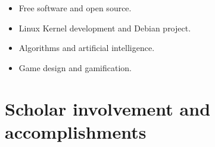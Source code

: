 \documentclass{res}
\newcommand{\inFrench}[1]{}
\newcommand{\inEnglish}[1]{#1}
\begin{document}
\begin{resume}
\inEnglish{
	\vspace{6pt}
	\begin{itemize} \itemsep -2pt
		\item Free software and open source.
		\item Linux Kernel development and Debian project.
		\item Algorithms and artificial intelligence.
		\item Game design and gamification.
	\end{itemize}
}

\inFrench{
	\section{Implication scolaire et accomplissements}
}
\inEnglish{
	\section{Scholar involvement and accomplishments}
}
\vspace{6pt}

\inFrench{
	SORT: Sustainability through Object Recognition and Training
	\hfill January to April 2017 \\
	{\sl Technical leader} \hfill (Projet de fin d'études universitaires)
	\vspace{0.05in}
	\begin{itemize} \itemsep -2pt
		\item Création d'une application reconnaissant les déchets dans une image pour aider la communauté.
		\item Recherche de logiciel de reconnaissance d'images (OpenCV, Yolo).
		\item Déploiment d'une architecture à multiple application avec Docker et Docker-compose.
		\item Gestion d'un projet open source sur GitHub (release, pull request, board, etc.).
	\end{itemize}

	{\sl Membre du club Formule ÉTS} \hfill (Club étudiant)
	\vspace{0.05in}
	\begin{itemize} \itemsep -2pt
		\item Création d’un document de vision ainsi qu’un document de spécification des requis pour une application de télémétrie en temps réel;
		\item Prototypage d'une application de télémétrie en temps réel en JavaScript.
	\end{itemize}

}
\end{resume}
\end{document}
